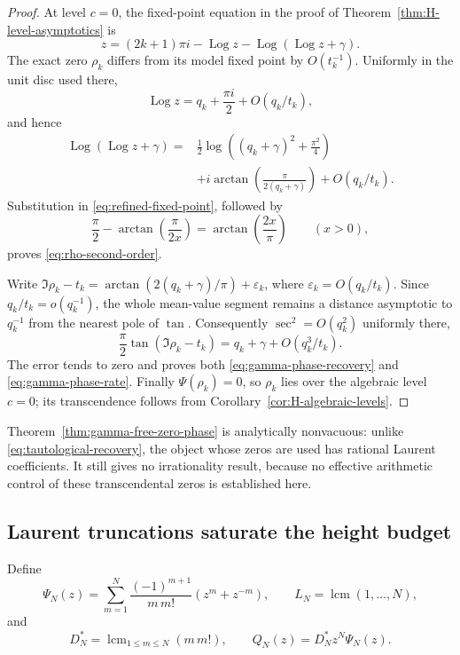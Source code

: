 \documentclass[11pt]{article}
\theoremstyle{definition}
\theoremstyle{remark}
\newcommand{\Log}{\operatorname{Log}}
\begin{document}
\begin{proof}
At level $c=0$, the fixed-point equation in the proof of
Theorem~\ref{thm:H-level-asymptotics} is
\begin{equation}\label{eq:refined-fixed-point}
 z=(2k+1)\pi i-\Log z-\Log(\Log z+\gamma).
\end{equation}
The exact zero $\rho_k$ differs from its model fixed point by $O(t_k^{-1})$.
Uniformly in the unit disc used there,
\[
 \Log z=q_k+\frac{\pi i}{2}+O(q_k/t_k),
\]
and hence
\begin{align*}
 \Log(\Log z+\gamma)
  ={}&\frac12\log\left((q_k+\gamma)^2+\frac{\pi^2}{4}\right)\\
   &+i\arctan\left(\frac{\pi}{2(q_k+\gamma)}\right)
     +O(q_k/t_k).
\end{align*}
Substitution in \eqref{eq:refined-fixed-point}, followed by
\[
 \frac\pi2-\arctan\left(\frac{\pi}{2x}\right)
 =\arctan\left(\frac{2x}{\pi}\right)
 \qquad(x>0),
\]
proves \eqref{eq:rho-second-order}.

Write
$\Im\rho_k-t_k=\arctan(2(q_k+\gamma)/\pi)+\varepsilon_k$, where
$\varepsilon_k=O(q_k/t_k)$.  Since $q_k/t_k=o(q_k^{-1})$, the whole
mean-value segment remains a distance asymptotic to $q_k^{-1}$ from the
nearest pole of $\tan$.  Consequently $\sec^2=O(q_k^2)$ uniformly there,
\[
 \frac\pi2\tan(\Im\rho_k-t_k)
 =q_k+\gamma+O(q_k^3/t_k).
\]
The error tends to zero and proves both
\eqref{eq:gamma-phase-recovery} and \eqref{eq:gamma-phase-rate}.
Finally $\Psi(\rho_k)=0$, so $\rho_k$ lies over the algebraic level
$c=0$; its transcendence follows from
Corollary~\ref{cor:H-algebraic-levels}.
\end{proof}

Theorem~\ref{thm:gamma-free-zero-phase} is analytically nonvacuous: unlike
\eqref{eq:tautological-recovery}, the object whose zeros are used has
rational Laurent coefficients.  It still gives no irrationality result,
because no effective arithmetic control of these transcendental zeros is
established here.

\subsection{Laurent truncations saturate the height budget}

Define
\begin{equation}\label{eq:Psi-truncation}
 \Psi_N(z)=\sum_{m=1}^N
 \frac{(-1)^{m+1}}{m\,m!}(z^m+z^{-m}),
 \qquad
 L_N=\operatorname{lcm}(1,\ldots,N),
\end{equation}
and
\begin{equation}\label{eq:QN-definition}
 D_N^*=\operatorname{lcm}_{1\le m\le N}(m\,m!),
 \qquad
 Q_N(z)=D_N^*z^N\Psi_N(z).
\end{equation}
\end{document}
